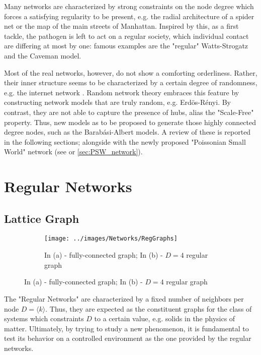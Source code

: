 \documentclass[a4paper,10pt,twoside]{book} %
\theoremstyle{definition}
\begin{document}
Many networks are characterized by strong constraints on the node degree which forces a satisfying regularity to be present, e.g. the radial architecture of a spider net or the map of the main streets of Manhattan.
Inspired by this, as a first tackle, the pathogen is left to act on a regular society, which individual contact are differing at most by one: famous examples are the "regular" Watts-Strogatz and the Caveman model.

Most of the real networks, however, do not show a comforting orderliness. 
Rather, their inner structure seems to be characterized by a certain degree of randomness, e.g. the internet network \cite{barabasi::2016networkbook}. Random network theory embraces this feature by constructing network models that are truly random, e.g. Erdös-Rényi. By contrast, they are not able to capture the presence of hubs, alias the "Scale-Free" property. Thus, new models as to be proposed to generate those highly connected degree nodes, such as the Barabási-Albert models.
A review of these is reported in the following sections; alongside with the newly proposed "Poissonian Small World" network (see \cite{Thurner::NetBasedExpl} or \autoref{sec:PSW_network}).

\section{Regular Networks}
\label{sec:RLN-Caveman_Description}
\subsection{Lattice Graph}
\begin{figure}[ht]
    \begin{subfigure}{\textwidth}
        \texttt{[image: ../images/Networks/RegGraphs]}
        \centering
        \caption{In (a) - fully-connected graph; In (b) - $D = 4$ regular graph \cite{Zelazo:2011_RSensNet_images}}
        \label{fig:RegGraph}
    \end{subfigure}
\end{figure}

The "Regular Networks" are characterized by a fixed number of neighbors per node $D = \langle k \rangle$. Thus, they are expected as the constituent graphs for the class of systems which constraints $D$ to a certain value, e.g. solids in the physics of matter.
Ultimately, by trying to study a new phenomenon, it is fundamental to test its behavior on a controlled environment as the one provided by the regular networks.
\end{document}
